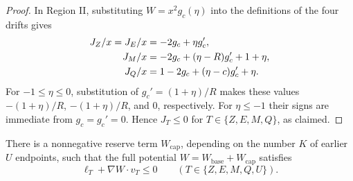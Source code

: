 \begin{proof}
In Region II, substituting $W=x^2g_c(\eta)$ into the definitions of the four
drifts gives
\begin{align}
 J_Z/x=J_E/x&=-2g_c+\eta g_c',
 \notag\\
 J_M/x&=-2g_c+(\eta-R)g_c'+1+\eta,
 \notag\\
 J_Q/x&=1-2g_c+(\eta-c)g_c'+\eta.
 \label{eq:opt:region-two-drifts}
\end{align}
For $-1\le\eta\le0$, substitution of
$g_c'=(1+\eta)/R$ makes these values $-(1+\eta)/R$,
$-(1+\eta)/R$, and $0$, respectively.  For $\eta\le-1$ their signs
are immediate from $g_c=g_c'=0$.  Hence $J_T\le0$ for
$T\in\{Z,E,M,Q\}$, as claimed.
\end{proof}

\begin{claim}[Reserve potential for jobs with $p=u$]
\label{clm:opt:adaptive-cap-potential}
There is a nonnegative reserve term $W_{\mathrm{cap}}$, depending on the
number $K$ of earlier $U$ endpoints, such that the full potential
$W=W_{\mathrm{base}}+W_{\mathrm{cap}}$ satisfies
\[
 \ell_T+\nabla W\mathbin{\cdot}v_T\le0
 \qquad(T\in\{Z,E,M,Q,U\}).
\]
\end{claim}

